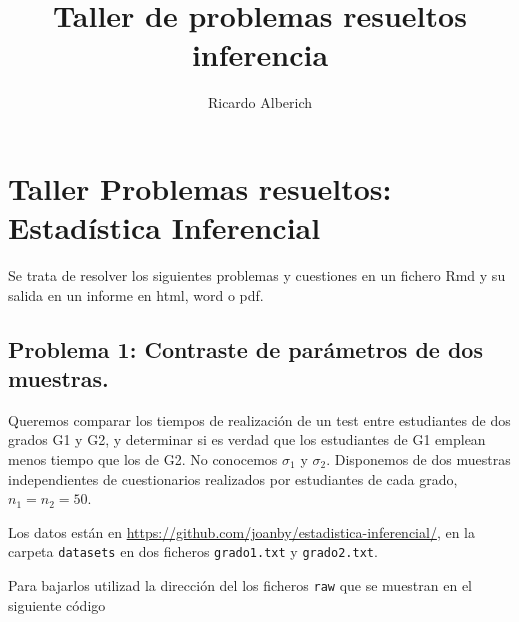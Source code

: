 \documentclass[
]{article}
\title{Taller de problemas resueltos inferencia}
\author{Ricardo Alberich}
\date{}
\begin{document}
\maketitle

{
\hypersetup{linkcolor=blue}
\setcounter{tocdepth}{2}
\tableofcontents
}
\hypertarget{taller-problemas-resueltos-estaduxedstica-inferencial}{%
\section{Taller Problemas resueltos: Estadística
Inferencial}\label{taller-problemas-resueltos-estaduxedstica-inferencial}}

Se trata de resolver los siguientes problemas y cuestiones en un fichero
Rmd y su salida en un informe en html, word o pdf.

\hypertarget{problema-1-contraste-de-paruxe1metros-de-dos-muestras.}{%
\subsection{Problema 1: Contraste de parámetros de dos
muestras.}\label{problema-1-contraste-de-paruxe1metros-de-dos-muestras.}}

Queremos comparar los tiempos de realización de un test entre
estudiantes de dos grados G1 y G2, y determinar si es verdad que los
estudiantes de G1 emplean menos tiempo que los de G2. No conocemos
\(\sigma_1\) y \(\sigma_2\). Disponemos de dos muestras independientes
de cuestionarios realizados por estudiantes de cada grado,
\(n_1=n_2=50\).

Los datos están en
\url{https://github.com/joanby/estadistica-inferencial/}, en la carpeta
\texttt{datasets} en dos ficheros \texttt{grado1.txt} y
\texttt{grado2.txt}.

Para bajarlos utilizad la dirección del los ficheros \texttt{raw} que se
muestran en el siguiente código
\end{document}
